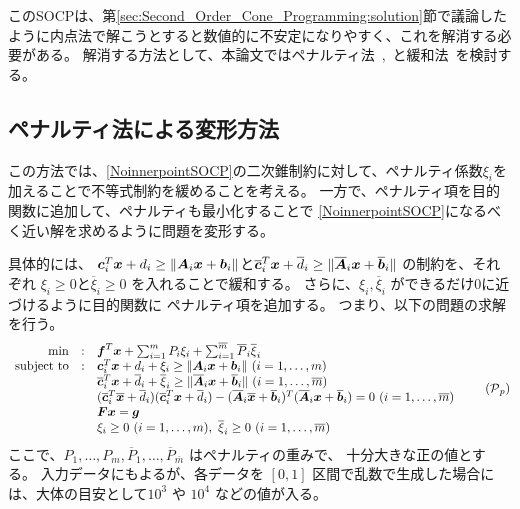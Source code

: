 \documentclass[11pt,a4paper,dvipdfmx,titlepage,uplatex]{jsarticle}
\theoremstyle{mystyle}
\newcommand{\0}{\mathbf{0}}
\def\b{\mbox{\boldmath $b$}}
\def\c{\mbox{\boldmath $c$}}
\def\f{\mbox{\boldmath $f$}}
\def\g{\mbox{\boldmath $g$}}
\def\x{\mbox{\boldmath $x$}}
\def\A{\mbox{\boldmath $A$}}
\def\F{\mbox{\boldmath $F$}}
\def\PC{\mbox{$\cal P$}}
\begin{document}
このSOCPは、第\ref{sec:Second_Order_Cone_Programming:solution}節で議論したように内点法で解こうとすると数値的に不安定になりやすく、これを解消する必要がある。
解消する方法として、本論文ではペナルティ法~\cite{benson2007exact},~\cite{fukuda2012differentiable}と緩和法~\cite{liu2020globally}を検討する。

\subsection{ペナルティ法による変形方法}\label{sec:Deformation_penalty}
この方法では、\eqref{NoinnerpointSOCP}の二次錐制約に対して、ペナルティ係数$\xi_i$を加えることで不等式制約を緩めることを考える。
一方で、ペナルティ項を目的関数に追加して、ペナルティも最小化することで
\eqref{NoinnerpointSOCP}になるべく近い解を求めるように問題を変形する。

具体的には、
$\c_i^T \x + d_i \ge \|\A_i \x + \b_i\| $と$
\overline{\c}_i^T \x + \overline{d}_i \ge \| \overline{\A}_i \x + \overline{\b}_i\|
$ の制約を、それぞれ
$\xi_i \ge 0$と$\overline{\xi}_i \ge 0$ を入れることで緩和する。
さらに、$\xi_i, \overline{\xi}_i$ ができるだけ$0$に近づけるように目的関数に
ペナルティ項を追加する。
つまり、以下の問題の求解を行う。
\begin{align}
	\begin{array}{rcl}
		\min & : & \f^T \x + \sum_{i=1}^{m} P_i \xi_i + \sum_{i=1}^{\overline{m}} \overline{P}_i \overline{\xi}_i \\
		\text{subject to} & : & \c_i^T \x + d_i+\xi_i \ge \|\A_i \x + \b_i\|
		\ (i=1, \ldots, m) \\
		& & \overline{\c}_i^T \x + \overline{d}_i + \overline{\xi}_i \ge \| \overline{\A}_i \x + \overline{\b}_i\|
		\ (i=1, \ldots, \overline{m}) \\
		& & (\overline{\c}_i^T \overline{\x} + \overline{d}_i)(\overline{\c}_i^T \x + \overline{d}_i)
    -
    (\overline{\A}_i \overline{\x} + \overline{\b}_i)^T(\overline{\A}_i \x + \overline{\b}_i) = 0 \ (i=1, \ldots, \overline{m}) \\
		& & \F \x = \g \\
		& & \xi_i \geq 0 \ (i=1, \ldots, m), \ \overline{\xi}_i \geq 0 \ (i=1, \ldots, \overline{m})
	\end{array}
  \tag{$\PC_p$}
  \label{NoinnerpointSOCP:penalty}
\end{align}
ここで、$P_1, \ldots, P_m , \overline{P}_1, \ldots, \overline{P}_{\overline{m}}$ はペナルティの重みで、
十分大きな正の値とする。
入力データにもよるが、各データを $[0,1]$ 区間で乱数で生成した場合には、大体の目安として$10^3$ や $10^4$ などの値が入る。
\end{document}
